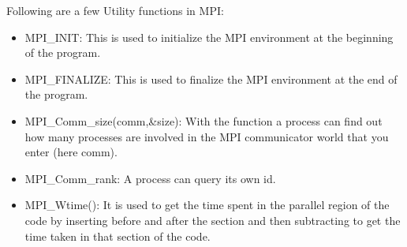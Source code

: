 \documentclass[12pt]{book}
\begin{document}
Following are a few Utility functions in MPI:
\begin{itemize}
    \item MPI\_INIT: This is used to initialize the MPI environment at the beginning of the program.
    \item MPI\_FINALIZE: This is used to finalize the MPI environment at the end of the program.
    \item MPI\_Comm\_size(comm,\&size): With the function a process can find out how many processes are involved in the MPI communicator world that you enter (here comm).
    \item MPI\_Comm\_rank: A process can query its own id.
    \item MPI\_Wtime(): It is used to get the time spent in the parallel region of the code by inserting before and after the section and then subtracting to get the time taken in that section of the code.
\end{itemize}
\end{document}
